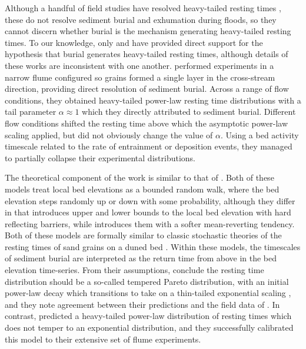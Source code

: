 \documentclass[draft]{agujournal2018}
\begin{document}
Although a handful of field studies have resolved heavy-tailed resting times \citep{Voepel2013, Olinde2015, Pretzlav2016, Bradley2017}, these do not resolve sediment burial and exhumation during floods, so they cannot discern whether burial is the mechanism generating heavy-tailed resting times.
To our knowledge, only \citet{Voepel2013} and \citet{Martin2014} have provided direct support for the hypothesis that burial generates heavy-tailed resting times, although details of these works are inconsistent with one another.
\citet{Martin2014} performed experiments in a narrow flume configured so grains formed a single layer in the cross-stream direction, providing direct resolution of sediment burial.
Across a range of flow conditions, they obtained heavy-tailed power-law resting time distributions with a tail parameter $\alpha \approx 1$ which they directly attributed to sediment burial.
Different flow conditions shifted the resting time above which the asymptotic power-law scaling applied, but did not obviously change the value of $\alpha$.
Using a bed activity timescale related to the rate of entrainment or deposition events, they managed to partially collapse their experimental distributions. 

The theoretical component of the \citet{Martin2014} work is similar to that of \citet{Voepel2013}.
Both of these models treat local bed elevations as a bounded random walk, where the bed elevation steps randomly up or down with some probability, although they differ in that \citet{Voepel2013} introduces upper and lower bounds to the local bed elevation with hard reflecting barriers, while \citet{Martin2014} introduces them with a softer mean-reverting tendency.
Both of these models are formally similar to classic stochastic theories of the resting times of sand grains on a duned bed \citep[e.g.][]{Yang1971, Nakagawa1980}.
Within these models, the timescales of sediment burial are interpreted as the return time from above in the bed elevation time-series.
From their assumptions, \citet{Voepel2013} conclude the resting time distribution should be a so-called tempered Pareto distribution, with an initial power-law decay which transitions to take on a thin-tailed exponential scaling \citep[e.g.][]{}, and they note agreement between their predictions and the field data of \citet{Habersack2001}.
In contrast, \citet{Martin2014} predicted a heavy-tailed power-law distribution of resting times which does not temper to an exponential distribution, and they successfully calibrated this model to their extensive set of flume experiments.
\end{document}
